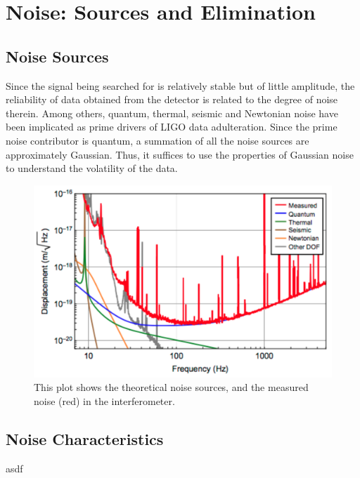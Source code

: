 \documentclass[twocolumn, groupedaddress]{revtex4-1}
\begin{document}
\section{Noise: Sources and Elimination}
\subsection{Noise Sources}
Since the signal being searched for is relatively stable but of little amplitude, the reliability of data obtained from the detector is related to the degree of noise therein. Among others, quantum, thermal, seismic and Newtonian noise have been implicated as prime drivers of LIGO data adulteration. Since the prime noise contributor is quantum, a summation of all the noise sources are approximately Gaussian. Thus, it suffices to use the properties of Gaussian noise to understand the volatility of the data.




\begin{figure}[H]
	\centering
	\includegraphics[width=.75\linewidth]{aligoNoise.png}
	\caption{This plot shows the theoretical noise sources, and the measured noise (red) in the interferometer.}
\end{figure}

\subsection{Noise Characteristics}
asdf
\end{document}
